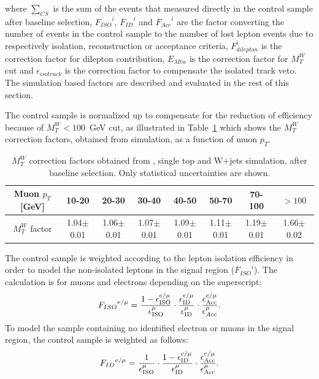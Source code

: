where $\sum_{CS}$ is the sum of the events that measured directly in the control sample after baseline selection, ${F_{ISO}}^{i}$, ${F_{ID}}^{i}$ and ${F_{Acc}}^{i}$ are the factor converting the number of events in the control sample to the number of lost lepton events due to respectively isolation, reconstruction or acceptance criteria, $F_{dilepton}^{i}$ is the correction factor for dilepton contribution, $E_{Mtw}$ is the correction factor for $M_{T}^{W}$ cut and $\epsilon_{isotrack}$ is the correction factor to compensate the isolated track veto. The simulation based factors are described and evaluated in the rest of this section.

The control sample is normalized up to compensate for the reduction of efficiency because of $M_{T}^{W}<100$~GeV cut, as illustrated in Table~\ref{tab:mtw} which shows the $M_{T}^{W}$ correction factors, obtained from simulation, as a function of muon $p_{T}$. 

\begin{table}[htbp]
\fontsize{10 pt}{1.2 em}
\caption{$M_{T}^{W}$ correction factors obtained from \ttbar, single top and W$+$jets simulation, after baseline selection. Only statistical uncertainties are shown.}
\begin{center}
\begin{tabular}{|c|c|c|c|c|c|c|c|}
\hline
\specialcell{Muon \\ $p_T$ [GeV]} & 10-20 & 20-30 & 30-40 & 40-50 & 50-70 & 70-100 & $>100$ \\
\hline
\specialcell{$M_{T}^{W}$ \\ factor} & 1.04$\pm$0.01 & 1.06$\pm$0.01 & 1.07$\pm$0.01 & 1.09$\pm$0.01 & 1.11$\pm$0.01 & 1.19$\pm$0.01 & 1.66$\pm$0.02 \\
\hline
\end{tabular}
\end{center}
\label{tab:mtw}
\end{table}

The control sample is weighted according to the lepton isolation efficiency in order to model the non-isolated leptons in the signal region (${F_{ISO}}^{i}$). 
The calculation is for muons and electrons depending on the superscript:
\begin{equation}
{F_{ISO}}^{e/\mu} =  \frac{1-\epsilon_{\rm ISO}^{e/\mu}}{\epsilon_{\rm ISO}^{\mu}} \cdot \frac{\epsilon^{e/\mu}_{\rm ID}}{\epsilon^{\mu}_{\rm ID}} \cdot \frac{\epsilon^{e/\mu}_{\rm Acc}}{\epsilon^{\mu}_{Acc}}.
\label{eq:isolation}
\end{equation}
To model the sample containing no identified electron or muons in the signal region, the control sample is weighted as follows:
\begin{equation}
{F_{ID}}^{e/\mu} = \frac{1}{\epsilon_{\rm ISO}^{\mu}}\cdot \frac{1-\epsilon_{\rm ID}^{e/\mu}}{\epsilon_{\rm ID}^{\mu}}  \cdot \frac{\epsilon^{e/\mu}_{\rm Acc}}{\epsilon^{\mu}_{\rm Acc}}.
\label{eq:id}
\end{equation}

